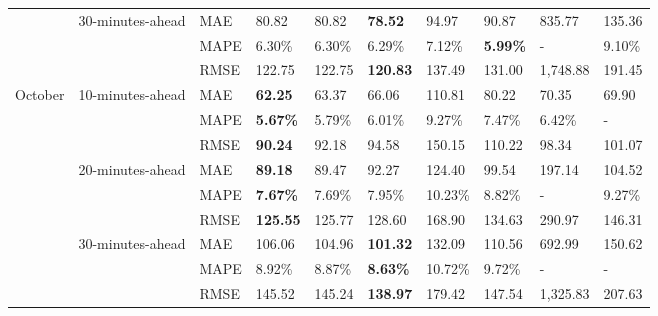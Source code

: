 {\begin{longtable}[htb!]{llllllllll}
 & {30-minutes-ahead} & MAE  & 80.82           & 80.82           & \textbf{78.52}  & 94.97   & 90.87           & 835.77   & 135.36 \\
 &                                   & MAPE & 6.30\%          & 6.30\%          & 6.29\%          & 7.12\%  & \textbf{5.99\%} & -        & 9.10\% \\
 &                                   & RMSE & 122.75          & 122.75          & \textbf{120.83} & 137.49  & 131.00          & 1,748.88 & 191.45 \\ \hline
{October} &
  {10-minutes-ahead} &
  MAE &
  \textbf{62.25} &
  63.37 &
  66.06 &
  110.81 &
  80.22 &
  70.35 &
  69.90 \\
 &                                   & MAPE & \textbf{5.67\%} & 5.79\%          & 6.01\%          & 9.27\%  & 7.47\%          & 6.42\%   & -      \\
 &                                   & RMSE & \textbf{90.24}  & 92.18           & 94.58           & 150.15  & 110.22          & 98.34    & 101.07 \\ \cline{2-10}
 & {20-minutes-ahead} & MAE  & \textbf{89.18}  & 89.47           & 92.27           & 124.40  & 99.54           & 197.14   & 104.52 \\
 &                                   & MAPE & \textbf{7.67\%} & 7.69\%          & 7.95\%          & 10.23\% & 8.82\%          & -        & 9.27\% \\
 &                                   & RMSE & \textbf{125.55} & 125.77          & 128.60          & 168.90  & 134.63          & 290.97   & 146.31 \\ \cline{2-10}
 &
  {30-minutes-ahead} &
  MAE &
  106.06 &
  104.96 &
  \textbf{101.32} &
  132.09 &
  110.56 &
  692.99 &
  150.62 \\
 &                                   & MAPE & 8.92\%          & 8.87\%          & \textbf{8.63\%} & 10.72\% & 9.72\%          & -        & -      \\
 &                                   & RMSE & 145.52          & 145.24          & \textbf{138.97} & 179.42  & 147.54          & 1,325.83 & 207.63 \\ \hline
\end{longtable}
}
